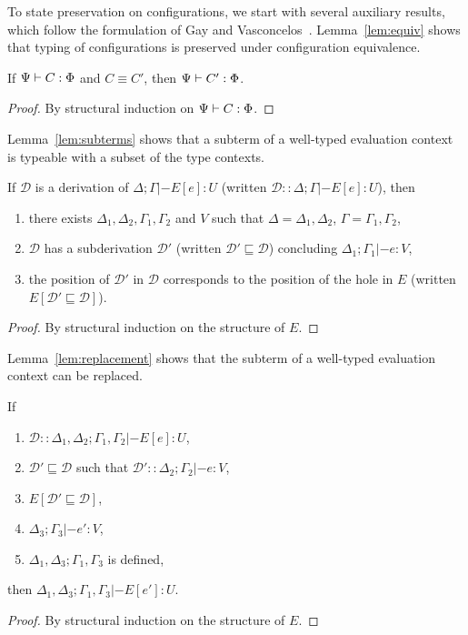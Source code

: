 To state preservation on configurations, we start with several auxiliary
results, which follow the formulation of Gay and
Vasconcelos~\cite{gay2010linear}.  Lemma~\ref{lem:equiv} shows that typing of
configurations is preserved under configuration equivalence.

\begin{lemma}\label{lem:equiv}
  If $\Psi |- C : \Phi$ and $C \equiv C'$, then $\Psi |- C' : \Phi$.
  \begin{proof}
    By structural induction on $\Psi |- C : \Phi$.
  \end{proof}
\end{lemma}

Lemma~\ref{lem:subterms} shows that a subterm of a well-typed evaluation context
is typeable with a subset of the type contexts. 

\begin{lemma}\label{lem:subterms}
  If $\mathcal{D}$ is a derivation of $\Delta; \Gamma |- E[e] : U$ (written $\mathcal{D}
  :: \Delta;\Gamma |- E[e] : U$), then
  \begin{enumerate}
    \item there exists $\Delta_1, \Delta_2, \Gamma_1,\Gamma_2$ and $V$ such that $\Delta = \Delta_1,\Delta_2$, $\Gamma =
      \Gamma_1,\Gamma_2$,
    \item $\mathcal{D}$ has a subderivation $\mathcal{D}'$ (written
      $\mathcal{D}' \sqsubseteq \mathcal{D}$) concluding $\Delta_1;\Gamma_1 |- e : V$,
    \item the position of $\mathcal{D}'$ in $\mathcal{D}$ corresponds to the
      position of the hole in $E$ (written $E[\mathcal{D}' \sqsubseteq \mathcal{D}]$).
  \end{enumerate}
  \begin{proof}
    By structural induction on the structure of $E$.
  \end{proof}
\end{lemma}

Lemma~\ref{lem:replacement} shows that the subterm of a well-typed evaluation
context can be replaced.

\begin{lemma}\label{lem:replacement}
  If
  \begin{enumerate}
  \item $\mathcal{D} :: \Delta_1,\Delta_2;\Gamma_1,\Gamma_2 |- E[e] : U$,
  \item $\mathcal{D}' \sqsubseteq \mathcal{D}$ such that $\mathcal{D}' :: \Delta_2; \Gamma_2 |- e : V$,
  \item $E[\mathcal{D}' \sqsubseteq \mathcal{D}]$,
  \item $\Delta_3;\Gamma_3 |- e' : V$,
  \item $\Delta_1,\Delta_3;\Gamma_1,\Gamma_3$ is defined,
  \end{enumerate}
  then $\Delta_1,\Delta_3;\Gamma_1,\Gamma_3 |- E[e'] : U$.
  \begin{proof}
    By structural induction on the structure of $E$.
  \end{proof}  
\end{lemma}

